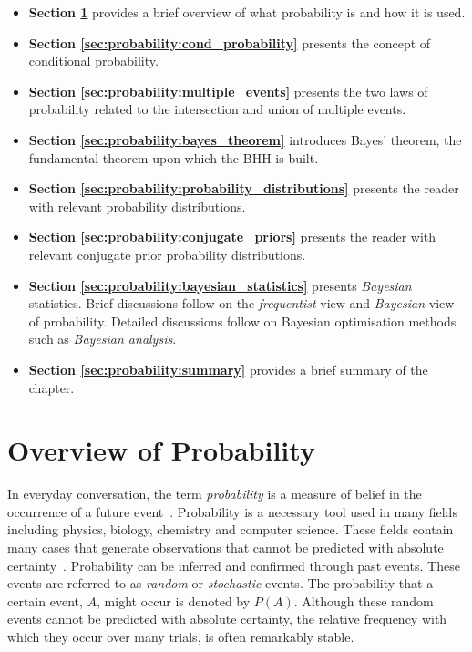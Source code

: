 \begin{itemize}
      \item \textbf{Section \ref{sec:probability:overview}} provides a brief overview of what probability is and how it is used.

      \item \textbf{Section \ref{sec:probability:cond_probability}} presents the concept of conditional probability.

      \item \textbf{Section \ref{sec:probability:multiple_events}} presents the two laws of probability related to the intersection and union of multiple events.

      \item \textbf{Section \ref{sec:probability:bayes_theorem}} introduces Bayes' theorem, the fundamental theorem upon which the \acs{BHH} is built.

      \item \textbf{Section \ref{sec:probability:probability_distributions}} presents the reader with relevant probability distributions.

      \item \textbf{Section \ref{sec:probability:conjugate_priors}} presents the reader with relevant conjugate prior probability distributions.

      \item \textbf{Section \ref{sec:probability:bayesian_statistics}} presents \textit{Bayesian} statistics. Brief discussions follow on the \textit{frequentist} view and \textit{Bayesian} view of probability. Detailed discussions follow on Bayesian optimisation methods such as \textit{Bayesian analysis}.

      \item \textbf{Section \ref{sec:probability:summary}} provides a brief summary of the chapter.
\end{itemize}


\section{Overview of Probability}\label{sec:probability:overview}

In everyday conversation, the term \textit{probability} is a measure of belief in the occurrence of a future event~\cite{ref:wackerly:2014}. Probability is a necessary tool used in many fields including physics, biology, chemistry and computer science. These fields contain many cases that generate observations that cannot be predicted with absolute certainty~\cite{ref:wackerly:2014}. Probability can be inferred and confirmed through past events. These events are referred to as \textit{random} or \textit{stochastic} events. The probability that a certain event, $A$, might occur is denoted by $P(A)$. Although these random events cannot be predicted with absolute certainty, the relative frequency with which they occur over many trials, is often remarkably stable.

